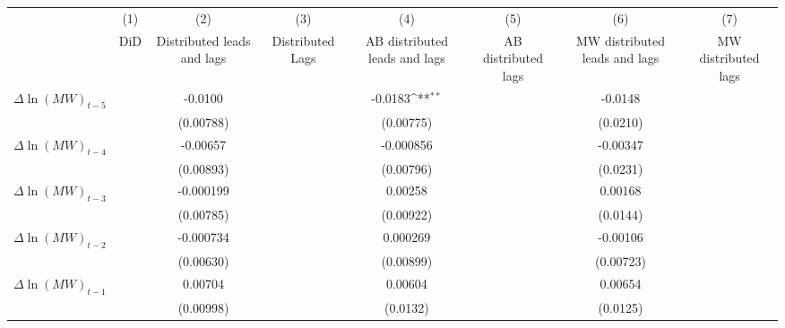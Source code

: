 {
\def\sym#1{\ifmmode^{#1}\else\(^{#1}\)\fi}
\begin{tabular}{l*{7}{c}}
\hline\hline
          &\multicolumn{1}{c}{(1)}&\multicolumn{1}{c}{(2)}&\multicolumn{1}{c}{(3)}&\multicolumn{1}{c}{(4)}&\multicolumn{1}{c}{(5)}&\multicolumn{1}{c}{(6)}&\multicolumn{1}{c}{(7)}\\
          &\multicolumn{1}{c}{DiD}&\multicolumn{1}{c}{Distributed leads and lags}&\multicolumn{1}{c}{Distributed Lags}&\multicolumn{1}{c}{AB distributed leads and lags}&\multicolumn{1}{c}{AB distributed lags}&\multicolumn{1}{c}{MW distributed leads and lags}&\multicolumn{1}{c}{MW distributed lags}\\
\hline
$\Delta \ln(MW)_{t-5}$&                  &  -0.0100         &                  &  -0.0183\sym{**} &                  &  -0.0148         &                  \\
          &                  &(0.00788)         &                  &(0.00775)         &                  & (0.0210)         &                  \\
[1em]
$\Delta \ln(MW)_{t-4}$&                  & -0.00657         &                  &-0.000856         &                  & -0.00347         &                  \\
          &                  &(0.00893)         &                  &(0.00796)         &                  & (0.0231)         &                  \\
[1em]
$\Delta \ln(MW)_{t-3}$&                  &-0.000199         &                  &  0.00258         &                  &  0.00168         &                  \\
          &                  &(0.00785)         &                  &(0.00922)         &                  & (0.0144)         &                  \\
[1em]
$\Delta \ln(MW)_{t-2}$&                  &-0.000734         &                  & 0.000269         &                  & -0.00106         &                  \\
          &                  &(0.00630)         &                  &(0.00899)         &                  &(0.00723)         &                  \\
[1em]
$\Delta \ln(MW)_{t-1}$&                  &  0.00704         &                  &  0.00604         &                  &  0.00654         &                  \\
          &                  &(0.00998)         &                  & (0.0132)         &                  & (0.0125)         &                  \\

\end{tabular}}
